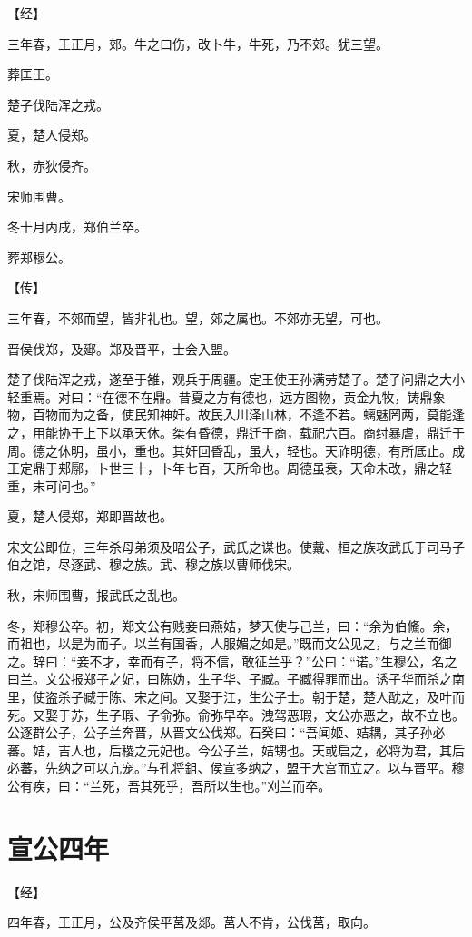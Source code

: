 \documentclass[a4paper,12pt,UTF8,twoside]{ctexbook}
\begin{document}
【经】

三年春，王正月，郊。牛之口伤，改卜牛，牛死，乃不郊。犹三望。

葬匡王。

楚子伐陆浑之戎。

夏，楚人侵郑。

秋，赤狄侵齐。

宋师围曹。

冬十月丙戌，郑伯兰卒。

葬郑穆公。

【传】

三年春，不郊而望，皆非礼也。望，郊之属也。不郊亦无望，可也。

晋侯伐郑，及郔。郑及晋平，士会入盟。

楚子伐陆浑之戎，遂至于雒，观兵于周疆。定王使王孙满劳楚子。楚子问鼎之大小轻重焉。对曰：“在德不在鼎。昔夏之方有德也，远方图物，贡金九牧，铸鼎象物，百物而为之备，使民知神奸。故民入川泽山林，不逢不若。螭魅罔两，莫能逢之，用能协于上下以承天休。桀有昏德，鼎迁于商，载祀六百。商纣暴虐，鼎迁于周。德之休明，虽小，重也。其奸回昏乱，虽大，轻也。天祚明德，有所厎止。成王定鼎于郏鄏，卜世三十，卜年七百，天所命也。周德虽衰，天命未改，鼎之轻重，未可问也。”

夏，楚人侵郑，郑即晋故也。

宋文公即位，三年杀母弟须及昭公子，武氏之谋也。使戴、桓之族攻武氏于司马子伯之馆，尽逐武、穆之族。武、穆之族以曹师伐宋。

秋，宋师围曹，报武氏之乱也。

冬，郑穆公卒。初，郑文公有贱妾曰燕姞，梦天使与己兰，曰：“余为伯鯈。余，而祖也，以是为而子。以兰有国香，人服媚之如是。”既而文公见之，与之兰而御之。辞曰：“妾不才，幸而有子，将不信，敢征兰乎？”公曰：“诺。”生穆公，名之曰兰。文公报郑子之妃，曰陈妫，生子华、子臧。子臧得罪而出。诱子华而杀之南里，使盗杀子臧于陈、宋之间。又娶于江，生公子士。朝于楚，楚人酖之，及叶而死。又娶于苏，生子瑕、子俞弥。俞弥早卒。洩驾恶瑕，文公亦恶之，故不立也。公逐群公子，公子兰奔晋，从晋文公伐郑。石癸曰：“吾闻姬、姞耦，其子孙必蕃。姞，吉人也，后稷之元妃也。今公子兰，姞甥也。天或启之，必将为君，其后必蕃，先纳之可以亢宠。”与孔将鉏、侯宣多纳之，盟于大宫而立之。以与晋平。穆公有疾，曰：“兰死，吾其死乎，吾所以生也。”刈兰而卒。


\chapter{宣公四年}



【经】

四年春，王正月，公及齐侯平莒及郯。莒人不肯，公伐莒，取向。
\end{document}
